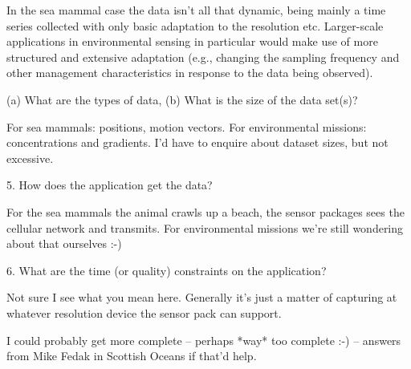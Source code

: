 \documentclass[preprint,12pt]{article}
\begin{document}
In the sea mammal case the data isn't all that dynamic, being mainly a
time series collected with only basic adaptation to the resolution etc.
Larger-scale applications in environmental sensing in particular would
make use of more structured and extensive adaptation (e.g.,
changing the sampling frequency and other management characteristics in
response to the data being observed).

(a) What are the types of data, (b) What is the size of the data set(s)?

For sea mammals: positions, motion vectors. For environmental missions:
concentrations and gradients. I'd have to enquire about dataset sizes,
but not excessive.

5. How does the application get the data?

For the sea mammals the animal crawls up a beach, the sensor packages
sees the cellular network and transmits. For environmental missions
we're still wondering about that ourselves :-)

6. What are the time (or quality) constraints on the application?

Not sure I see what you mean here. Generally it's just a matter of
capturing at whatever resolution device the sensor pack can support.

I could probably get more complete -- perhaps *way* too complete :-) --
answers from Mike Fedak in Scottish Oceans if that'd help.
\end{document}
